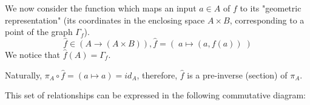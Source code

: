 \documentclass[12pt, letterpaper, twoside]{report}
\begin{document}
We now consider the function which maps an input $a \in A$ of $f$ to its "geometric representation" (its coordinates in the enclosing space $A \times B$, corresponding to a point of the graph $\Gamma_f$). 
$$\hat{f} \in (A \to (A \times B)), \hat{f} = ( \; a \mapsto (a, f(a)) \; )$$
We notice that $\hat{f}(A) = \Gamma_f$.

Naturally, $\pi_A \circ \hat{f} = (a \mapsto a) = id_A$, therefore, $\hat{f}$ is a pre-inverse (section) of $\pi_A$.

This set of relationships can be expressed in the following commutative diagram:

\end{document}
